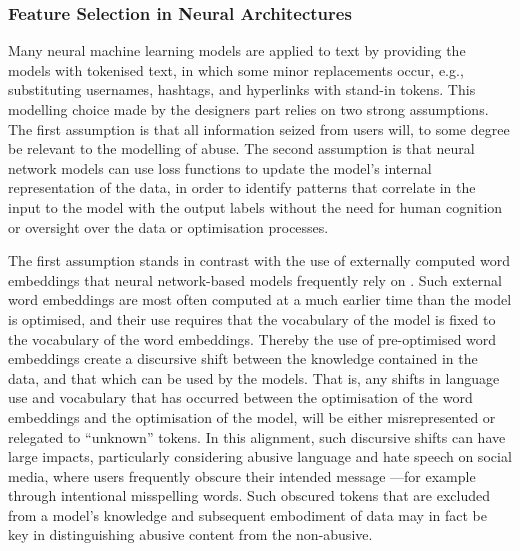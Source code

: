 {\subsubsection{Feature Selection in Neural Architectures}
Many neural machine learning models are applied to text by providing the models with tokenised text, in which some minor replacements occur, e.g., substituting usernames, hashtags, and hyperlinks with stand-in tokens.
This modelling choice made by the designers part relies on two strong assumptions.
The first assumption is that all information seized from users will, to some degree be relevant to the modelling of abuse.
The second assumption is that neural network models can use loss functions to update the model's internal representation of the data, in order to identify patterns that correlate in the input to the model with the output labels without the need for human cognition or oversight over the data or optimisation processes.

The first assumption stands in contrast with the use of externally computed word embeddings that neural network-based models frequently rely on \citep{Kshirsagar:2018,Isaksen:2020}.
Such external word embeddings are most often computed at a much earlier time than the model is optimised, and their use requires that the vocabulary of the model is fixed to the vocabulary of the word embeddings.
Thereby the use of pre-optimised word embeddings create a discursive shift between the knowledge contained in the data, and that which can be used by the models.
That is, any shifts in language use and vocabulary that has occurred between the optimisation of the word embeddings and the optimisation of the model, will be either misrepresented or relegated to ``unknown'' tokens.
In this alignment, such discursive shifts can have large impacts, particularly considering abusive language and hate speech on social media, where users frequently obscure their intended message \citep{Rottger:2021}---for example through intentional misspelling words.
Such obscured tokens that are excluded from a model's knowledge and subsequent embodiment of data may in fact be key in distinguishing abusive content from the non-abusive.

}
